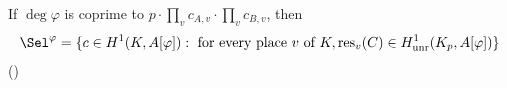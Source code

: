 \begin{corollary}
    If $\deg \varphi$ is coprime to $p \cdot \prod_{v}  c_{A,v} \cdot\prod_{v} c_{B,v}$, then 
    $$\Sel^{\varphi} = \{c \in H^1(K, A[\varphi]) : \text{ for every place } v \text{ of } K, \text{res}_v(C) \in H_{\text{unr}}^1 (K_p, A[\varphi]) \}$$
    ()


\end{corollary}
